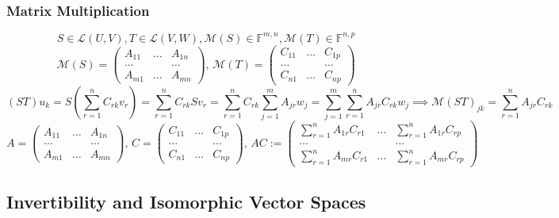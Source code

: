 \documentclass{article}
\newcommand{\F}{\mathbb{F}}
\newcommand{\0}{{\bf{0}}}
\begin{document}
\subsubsection{Matrix Multiplication}
$$S\in\mathcal{L}(U,V),T\in\mathcal{L}(V,W),\mathcal{M}(S)\in\F^{m,n},\mathcal{M}(T)\in\F^{n,p}$$
$$\mathcal{M}(S)=\begin{pmatrix}
    A_{11}&\dots&A_{1n}\\
    \dots&&\dots\\
    A_{m1}&\dots&A_{mn}
\end{pmatrix},\,\mathcal{M}(T)=\begin{pmatrix}
    C_{11}&\dots&C_{1p}\\
    \dots&&\dots\\
    C_{n1}&\dots&C_{np}
\end{pmatrix}$$
$$(ST)u_k=S\left(\sum_{r=1}^n C_{rk}v_r\right)=\sum_{r=1}^n C_{rk}Sv_r=\sum_{r=1}^n C_{rk}\sum_{j=1}^mA_{jr}w_j=\sum_{j=1}^m\sum_{r=1}^nA_{jr}C_{rk}w_j\implies\mathcal{M}(ST)_{jk}=\sum_{r=1}^nA_{jr}C_{rk}$$
$$A=\begin{pmatrix}
    A_{11}&\dots&A_{1n}\\
    \dots&&\dots\\
    A_{m1}&\dots&A_{mn}
\end{pmatrix},\,C=\begin{pmatrix}
    C_{11}&\dots&C_{1p}\\
    \dots&&\dots\\
    C_{n1}&\dots&C_{np}
\end{pmatrix},\,AC:=\begin{pmatrix}
\displaystyle\sum_{r=1}^nA_{1r}C_{r1}&\dots&\displaystyle\sum_{r=1}^nA_{1r}C_{rp}\\
\dots&&\dots\\
\displaystyle\sum_{r=1}^nA_{mr}C_{r1}&\dots&\displaystyle\sum_{r=1}^nA_{mr}C_{rp}
\end{pmatrix}$$
\subsection{Invertibility and Isomorphic Vector Spaces}
\end{document}
